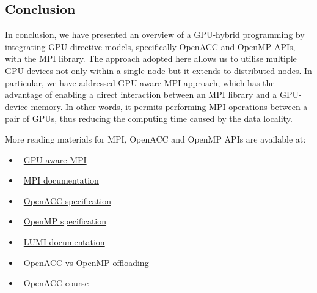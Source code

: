 

\subsection{Conclusion}


\par
In conclusion, we have presented an overview of a GPU-hybrid programming by integrating GPU-directive models, specifically OpenACC and OpenMP APIs, with the MPI library.
The approach adopted here allows us to utilise multiple GPU-devices not only within a single node but it extends to distributed nodes.
In particular, we have addressed GPU-aware MPI approach, which has the advantage of enabling a direct interaction between an MPI library and a GPU-device memory.
In other words, it permits performing MPI operations between a pair of GPUs, thus reducing the computing time caused by the data locality.


\par
More reading materials for MPI, OpenACC and OpenMP APIs are available at:
\begin{itemize}
    \item~\href{https://documentation.sigma2.no/code_development/guides/gpuaware_mpi.html}{GPU-aware MPI}
    \item~\href{https://www.mpi-forum.org/docs/mpi-4.0/mpi40-report.pdf}{MPI documentation}
    \item~\href{https://www.openacc.org/sites/default/files/inline-images/Specification/OpenACC-3.2-final.pdf}{OpenACC specification}
    \item~\href{https://www.openmp.org/wp-content/uploads/OpenMP-API-Specification-5-2.pdf}{OpenMP specification}
    \item~\href{https://docs.lumi-supercomputer.eu/development/compiling/prgenv/}{LUMI documentation}
    \item~\href{https://documentation.sigma2.no/code_development/guides/converting_acc2omp/openacc2openmp.html}{OpenACC vs OpenMP offloading}
    \item~\href{https://github.com/HichamAgueny/GPU-course}{OpenACC course}
\end{itemize}

